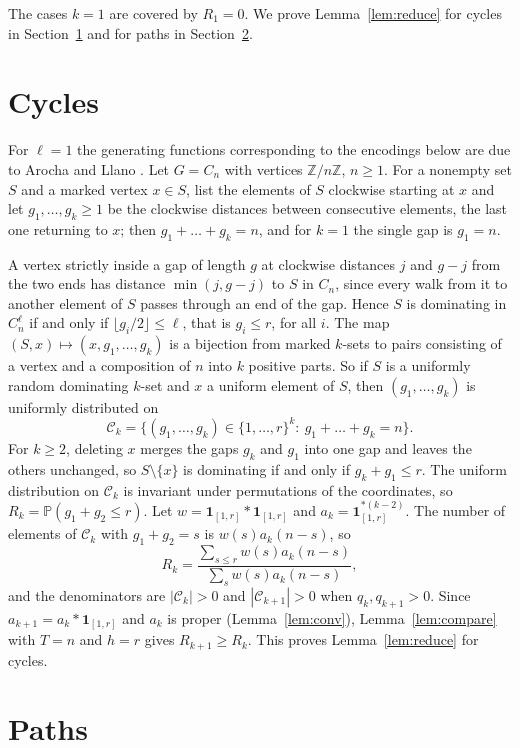 \documentclass[11pt,a4paper]{amsart}
\theoremstyle{definition}
\theoremstyle{remark}
\newcommand{\one}{\mathbf 1}
\newcommand{\Prob}{\mathbb P}
\begin{document}
The cases $k=1$ are covered by $R_1=0$. We prove Lemma~\ref{lem:reduce} for cycles in Section~\ref{sec:cycles} and for paths in Section~\ref{sec:paths}.

\section{Cycles}\label{sec:cycles}

For $\ell=1$ the generating functions corresponding to the encodings below are due to Arocha and Llano \cite{AL}. Let $G=C_n$ with vertices $\mathbb Z/n\mathbb Z$, $n\ge 1$. For a nonempty set $S$ and a marked vertex $x\in S$, list the elements of $S$ clockwise starting at $x$ and let $g_1,\dots,g_k\ge1$ be the clockwise distances between consecutive elements, the last one returning to $x$; then $g_1+\dots+g_k=n$, and for $k=1$ the single gap is $g_1=n$.

A vertex strictly inside a gap of length $g$ at clockwise distances $j$ and $g-j$ from the two ends has distance $\min(j,g-j)$ to $S$ in $C_n$, since every walk from it to another element of $S$ passes through an end of the gap. Hence $S$ is dominating in $C_n^\ell$ if and only if $\lfloor g_i/2\rfloor\le\ell$, that is $g_i\le r$, for all $i$. The map $(S,x)\mapsto(x,g_1,\dots,g_k)$ is a bijection from marked $k$-sets to pairs consisting of a vertex and a composition of $n$ into $k$ positive parts. So if $S$ is a uniformly random dominating $k$-set and $x$ a uniform element of $S$, then $(g_1,\dots,g_k)$ is uniformly distributed on
\[
\mathcal C_k=\{(g_1,\dots,g_k)\in\{1,\dots,r\}^k:\ g_1+\dots+g_k=n\}.
\]
For $k\ge 2$, deleting $x$ merges the gaps $g_k$ and $g_1$ into one gap and leaves the others unchanged, so $S\setminus\{x\}$ is dominating if and only if $g_k+g_1\le r$. The uniform distribution on $\mathcal C_k$ is invariant under permutations of the coordinates, so $R_k=\Prob(g_1+g_2\le r)$. Let $w=\one_{[1,r]}*\one_{[1,r]}$ and $a_k=\one_{[1,r]}^{*(k-2)}$. The number of elements of $\mathcal C_k$ with $g_1+g_2=s$ is $w(s)a_k(n-s)$, so
\[
R_k=\frac{\sum_{s\le r}w(s)a_k(n-s)}{\sum_sw(s)a_k(n-s)},
\]
and the denominators are $|\mathcal C_k|>0$ and $|\mathcal C_{k+1}|>0$ when $q_k,q_{k+1}>0$. Since $a_{k+1}=a_k*\one_{[1,r]}$ and $a_k$ is proper (Lemma~\ref{lem:conv}), Lemma~\ref{lem:compare} with $T=n$ and $h=r$ gives $R_{k+1}\ge R_k$. This proves Lemma~\ref{lem:reduce} for cycles.

\section{Paths}\label{sec:paths}
\end{document}
